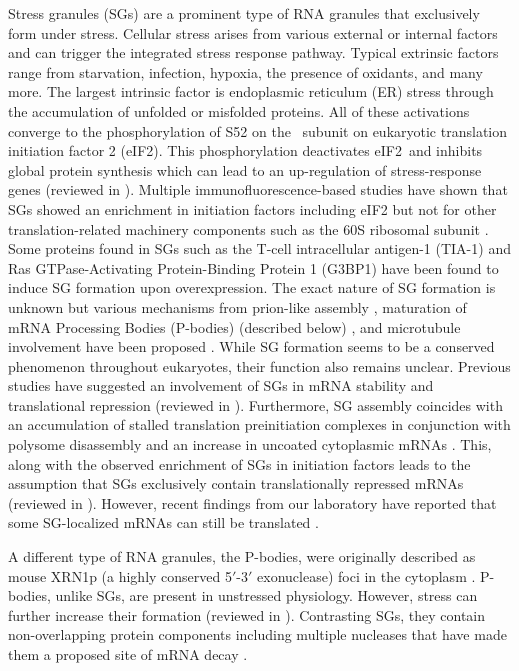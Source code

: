 Stress granules (SGs) are a prominent type of RNA granules that exclusively form under stress.
Cellular stress arises from various external or internal factors and can trigger the integrated stress response pathway.
Typical extrinsic factors range from starvation, infection, hypoxia, the presence of oxidants, and many more.
The largest intrinsic factor is endoplasmic reticulum (ER) stress through the accumulation of unfolded or misfolded proteins.
All of these activations converge to the phosphorylation of S52 on the \textalpha\ subunit on eukaryotic translation initiation factor 2 (eIF2\textalpha).
This phosphorylation deactivates eIF2\textalpha\ and inhibits global protein synthesis which can lead to an up-regulation of stress-response genes (reviewed in \cite{pakoszebrucka_integrated_2016}).
Multiple immunofluorescence-based studies have shown that SGs showed an enrichment in initiation factors including eIF2 but not for other translation-related machinery components such as the 60S ribosomal subunit \cite{kimball_mammalian_2003}.
Some proteins found in SGs such as the T-cell intracellular antigen-1 (TIA-1) \cite{kedersha_rna-binding_1999} and Ras GTPase-Activating Protein-Binding Protein 1 (G3BP1) \cite{tourriere_rasgap-associated_2003} have been found to induce SG formation upon overexpression.
The exact nature of SG formation is unknown but various mechanisms from prion-like assembly \cite{gilks_stress_2004, shattuck_prion-like_2019}, maturation of mRNA Processing Bodies (P-bodies) (described below) \cite{buchan_p_2008}, and microtubule involvement have been proposed \cite{ivanov_disruption_2003}.
While SG formation seems to be a conserved phenomenon throughout eukaryotes, their function also remains unclear.
Previous studies have suggested an involvement of SGs in mRNA stability and translational repression (reviewed in \cite{buchan_eukaryotic_2009}).
Furthermore, SG assembly coincides with an accumulation of stalled translation preinitiation complexes in conjunction with polysome disassembly and an increase in uncoated cytoplasmic mRNAs \cite{panas_mechanistic_2016}.
This, along with the observed enrichment of SGs in initiation factors leads to the assumption that SGs exclusively contain translationally repressed mRNAs (reviewed in \cite{thomas_rna_2011}).
However, recent findings from our laboratory have reported that some SG-localized mRNAs can still be translated \cite{mateju_single-molecule_2020}.

A different type of RNA granules, the P-bodies, were originally described as mouse XRN1p (a highly conserved 5$'$-3$'$ exonuclease) foci in the cytoplasm \cite{bashkirov_mouse_1997}.
P-bodies, unlike SGs, are present in unstressed physiology.
However, stress can further increase their formation (reviewed in \cite{parker_p_2007}).
Contrasting SGs, they contain non-overlapping protein components including multiple nucleases that have made them a proposed site of mRNA decay \cite{sheth_decapping_2003}.

